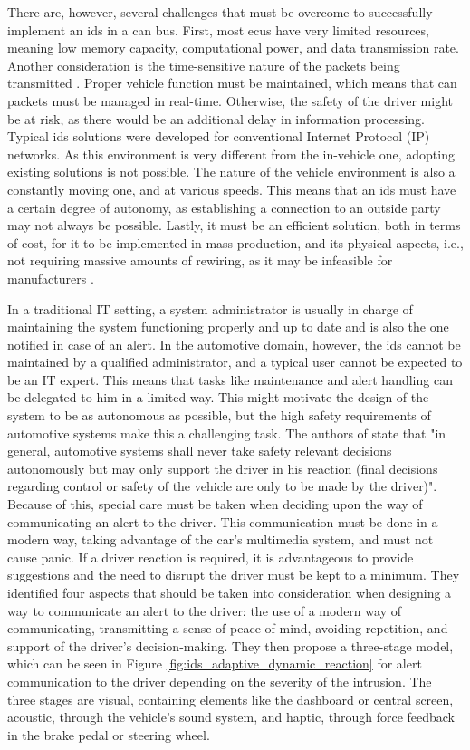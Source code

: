 There are, however, several challenges that must be overcome to successfully implement an \gls{ids} in a \gls{can} bus. First, most \glspl{ecu} have very limited resources, meaning low memory capacity, computational power, and data transmission rate. Another consideration is the time-sensitive nature of the packets being transmitted \citep{hoppe2009applying}. Proper vehicle function must be maintained, which means that \gls{can} packets must be managed in real-time. Otherwise, the safety of the driver might be at risk, as there would be an additional delay in information processing. Typical \gls{ids} solutions were developed for conventional Internet Protocol (IP) networks. As this environment is very different from the in-vehicle one, adopting existing solutions is not possible. The nature of the vehicle environment is also a constantly moving one, and at various speeds. This means that an \gls{ids} must have a certain degree of autonomy, as establishing a connection to an outside party may not always be possible. Lastly, it must be an efficient solution, both in terms of cost, for it to be implemented in mass-production, and its physical aspects, i.e., not requiring massive amounts of rewiring, as it may be infeasible for manufacturers \citep{Lokman2019}.\par
In a traditional IT setting, a system administrator is usually in charge of maintaining the system functioning properly and up to date and is also the one notified in case of an alert. In the automotive domain, however, the \gls{ids} cannot be maintained by a qualified administrator, and a typical user cannot be expected to be an IT expert. This means that tasks like maintenance and alert handling can be delegated to him in a limited way. This might motivate the design of the system to be as autonomous as possible, but the high safety requirements of automotive systems make this a challenging task. The authors of \citep{hoppe2009applying} state that "in general, automotive systems shall never take safety relevant decisions autonomously but may only support the driver in his reaction (final decisions regarding control or safety of the vehicle are only to be made by the driver)". Because of this, special care must be taken when deciding upon the way of communicating an alert to the driver. This communication must be done in a modern way, taking advantage of the car's multimedia system, and must not cause panic. If a driver reaction is required, it is advantageous to provide suggestions and the need to disrupt the driver must be kept to a minimum. They identified four aspects that should be taken into consideration when designing a way to communicate an alert to the driver: the use of a modern way of communicating, transmitting a sense of peace of mind, avoiding repetition, and support of the driver's decision-making. They then propose a three-stage model, which can be seen in Figure \ref{fig:ids_adaptive_dynamic_reaction} for alert communication to the driver depending on the severity of the intrusion. The three stages are visual, containing elements like the dashboard or central screen, acoustic, through the vehicle's sound system, and haptic, through force feedback in the brake pedal or steering wheel.

